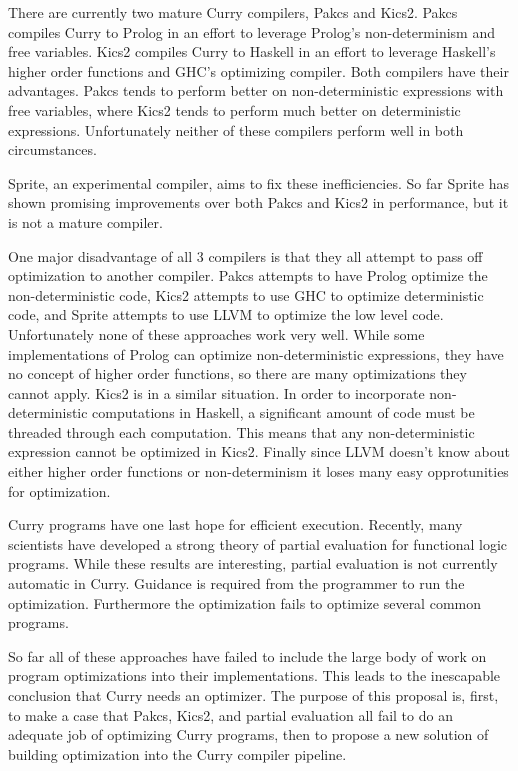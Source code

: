 There are currently two mature Curry compilers, Pakcs and Kics2.
Pakcs compiles Curry to Prolog in an effort to leverage Prolog's non-determinism and free variables.
Kics2 compiles Curry to Haskell in an effort to leverage Haskell's higher order functions and GHC's optimizing compiler.
Both compilers have their advantages.  Pakcs tends to perform better on non-deterministic expressions with free variables,
where Kics2 tends to perform much better on deterministic expressions.
Unfortunately neither of these compilers perform well in both circumstances.

Sprite, an experimental compiler, aims to fix these inefficiencies.
So far Sprite has shown promising improvements over both Pakcs and Kics2 in performance,
but it is not a mature compiler.

One major disadvantage of all 3 compilers is that they all attempt to pass off optimization to another compiler.
Pakcs attempts to have Prolog optimize the non-deterministic code, Kics2 attempts to use GHC to optimize
deterministic code, and Sprite attempts to use LLVM to optimize the low level code.
Unfortunately none of these approaches work very well.
While some implementations of Prolog can optimize non-deterministic expressions, they have no concept of higher order functions,
so there are many optimizations they cannot apply.
Kics2 is in a similar situation.  
In order to incorporate non-deterministic computations in Haskell, 
a significant amount of code must be threaded through each computation.
This means that any non-deterministic expression cannot be optimized in Kics2.
Finally since LLVM doesn't know about either higher order functions or non-determinism it loses many easy opprotunities for optimization.

Curry programs have one last hope for efficient execution.
Recently, many scientists \cite{} have developed a strong theory of partial evaluation for functional logic programs.
While these results are interesting, partial evaluation is not currently automatic in Curry.
Guidance is required from the programmer to run the optimization.
Furthermore the optimization fails to optimize several common programs.

So far all of these approaches have failed to include the large body of work on program optimizations into their implementations.
This leads to the inescapable conclusion that Curry needs an optimizer.
The purpose of this proposal is, first, to make a case that Pakcs, Kics2, and partial evaluation all fail to do an adequate job
of optimizing Curry programs, then to propose a new solution of building optimization into the Curry compiler pipeline.


